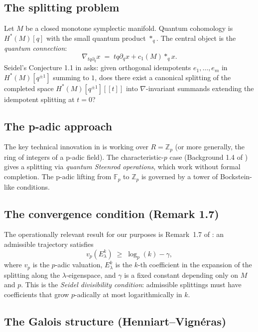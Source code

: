 \documentclass[11pt]{amsart}
\theoremstyle{definition}
\begin{document}
\subsection{The splitting problem}

Let $M$ be a closed monotone symplectic manifold.
Quantum cohomology is $H^*(M)[q]$ with the small quantum product $*_q$.
The central object is the \emph{quantum connection}:
\[
  \nabla_{tq\partial_q} x \;=\; tq\partial_q x + c_1(M) *_q x.
\]
Seidel's Conjecture 1.1 in \cite{Seidel25} asks: given orthogonal idempotents
$e_1, \ldots, e_m$ in $H^*(M)[q^{\pm 1}]$ summing to $1$, does there exist
a canonical splitting of the completed space $H^*(M)[q^{\pm 1}][[t]]$ into
$\nabla$-invariant summands extending the idempotent splitting at $t=0$?

\subsection{The p-adic approach}

The key technical innovation in \cite{Seidel25} is working over
$R = \mathbb{Z}_p$ (or more generally, the ring of integers of a p-adic field).
The characteristic-$p$ case (Background 1.4 of \cite{Seidel25}) gives a
splitting via \emph{quantum Steenrod operations}, which work without
formal completion.
The p-adic lifting from $\mathbb{F}_p$ to $\mathbb{Z}_p$ is governed by
a tower of Bockstein-like conditions.

\subsection{The convergence condition (Remark 1.7)}
\label{sec:seidel-remark17}

The operationally relevant result for our purposes is Remark~1.7 of \cite{Seidel25}:
an admissible trajectory satisfies
\[
  v_p(E_\lambda^k) \;\geq\; \log_p(k) - \gamma,
\]
where $v_p$ is the $p$-adic valuation, $E_\lambda^k$ is the $k$-th coefficient
in the expansion of the splitting along the $\lambda$-eigenspace, and $\gamma$
is a fixed constant depending only on $M$ and $p$.
This is the \emph{Seidel divisibility condition}: admissible splittings must
have coefficients that grow $p$-adically at most logarithmically in $k$.

\subsection{The Galois structure (Henniart--Vign\'eras)}
\label{sec:hv}
\end{document}
